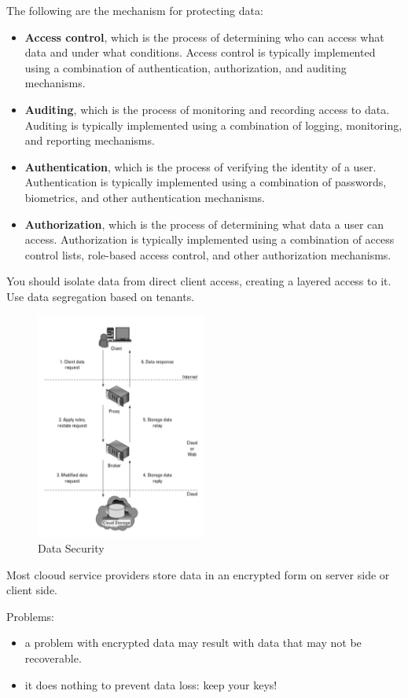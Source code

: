 The following are the mechanism for protecting data:
\begin{itemize}
    \item \textbf{Access control}, which is the process of determining who can access what data and under what conditions. Access control is typically implemented using a combination of authentication, authorization, and auditing mechanisms.
    \item \textbf{Auditing}, which is the process of monitoring and recording access to data. Auditing is typically implemented using a combination of logging, monitoring, and reporting mechanisms.
    \item \textbf{Authentication}, which is the process of verifying the identity of a user. Authentication is typically implemented using a combination of passwords, biometrics, and other authentication mechanisms.
    \item \textbf{Authorization}, which is the process of determining what data a user can access. Authorization is typically implemented using a combination of access control lists, role-based access control, and other authorization mechanisms.
\end{itemize}

You should isolate data from direct client access, creating a layered access to it. Use data segregation based on tenants.

\begin{figure}[H]
    \centering
    \includegraphics[width=0.5\textwidth]{assets/fig50.png}
    \caption{Data Security}
\end{figure}

Most clooud service providers store data in an encrypted form on server side or client side. 

Problems:
\begin{itemize}
    \item a problem with encrypted data may result with data that may not be
    recoverable.
    \item it does nothing to prevent data loss: keep your keys!
\end{itemize}




